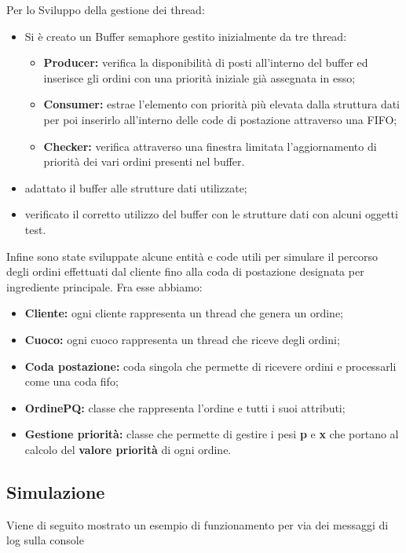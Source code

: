 Per lo Sviluppo della gestione dei thread:
\begin{itemize}
    \item Si è creato un Buffer semaphore gestito inizialmente da tre thread:
    \begin{itemize}
        \item \textbf{Producer:} verifica la disponibilità di posti all'interno del buffer ed inserisce gli ordini con una priorità iniziale già assegnata in esso;
        \item \textbf{Consumer:} estrae l'elemento con priorità più elevata dalla struttura dati per poi inserirlo all'interno delle code di postazione attraverso una FIFO;
        \item \textbf{Checker:} verifica attraverso una finestra limitata l'aggiornamento di priorità dei vari ordini presenti nel buffer. 
    \end{itemize}
    \item adattato il buffer alle strutture dati utilizzate;
    \item verificato il corretto utilizzo del buffer con le strutture dati con alcuni oggetti test.
\end{itemize}

Infine sono state sviluppate alcune entità e code utili per simulare il percorso degli ordini effettuati dal cliente fino alla coda di postazione designata per ingrediente principale. 
Fra esse abbiamo:
\begin{itemize}
	\item \textbf{Cliente:} ogni cliente rappresenta un thread che genera un ordine;
	\item \textbf{Cuoco:} ogni cuoco rappresenta un thread che riceve degli ordini;
	\item \textbf{Coda postazione:} coda singola che permette di ricevere ordini e processarli come una coda fifo;
	\item \textbf{OrdinePQ:} classe che rappresenta l'ordine e tutti i suoi attributi;
	\item \textbf{Gestione priorità:} classe che permette di gestire i pesi \textbf{p} e \textbf{x} che portano al calcolo del \textbf{valore priorità} di ogni ordine.
\end{itemize}
\newpage
\subsection{Simulazione}
Viene di seguito mostrato un esempio di funzionamento per via dei messaggi di log sulla console
